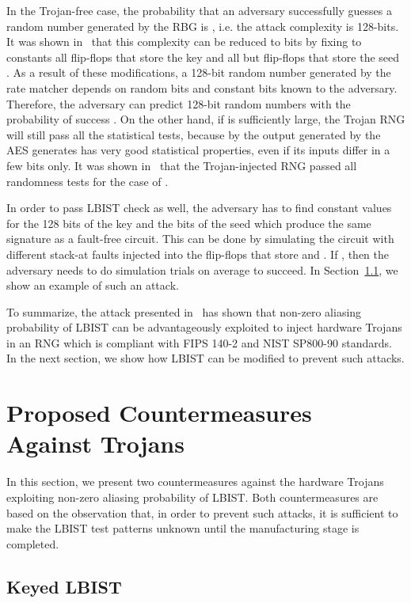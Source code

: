 \documentclass[a4paper]{llncs}
\begin{document}
In the Trojan-free case, the probability that an adversary successfully guesses a random
number generated by the RBG is , i.e. the attack complexity is 128-bits. 
It was shown in~\cite{BeRPB13} that this complexity can be reduced to  bits by
fixing to constants all flip-flops that store the key  and all but 
flip-flops that store the seed . As a result of these modifications, a 128-bit random number generated by the rate matcher
depends on  random bits and  constant bits known to the adversary.
Therefore, the adversary can predict 128-bit random numbers with the
probability of success . On the other hand, if  is sufficiently large, the Trojan RNG will still pass all the statistical tests, because by the output generated by the AES generates has very good statistical properties, even if its inputs differ in a few bits only. It was shown in~\cite{BeRPB13} that the Trojan-injected RNG passed all randomness tests for the case of . 

In order to pass LBIST check as well, the adversary has to find constant values for the 128 bits of the key  and the  bits of the seed  which produce the same signature as a fault-free circuit. This can be done by simulating the circuit with different stack-at faults injected into the flip-flops that store  and . If , then the adversary needs to do  simulation trials on average to succeed. In Section~\ref{pres1}, we show an example of such an attack. 

To summarize, the attack presented in~\cite{BeRPB13} has shown that non-zero aliasing probability of LBIST can be advantageously exploited to inject hardware Trojans in an RNG which is compliant with FIPS 140-2 and NIST SP800-90 standards. In the next section, we show how LBIST can be modified to prevent such attacks. 


\section{Proposed Countermeasures Against Trojans} \label{pres}

In this section, we present two countermeasures against the hardware Trojans exploiting non-zero aliasing probability of LBIST.
Both countermeasures are based on the observation that, in order to prevent such attacks, it is sufficient to make the LBIST test patterns unknown until the manufacturing stage is completed. 


\subsection{Keyed LBIST} \label{pres1}
\end{document}
